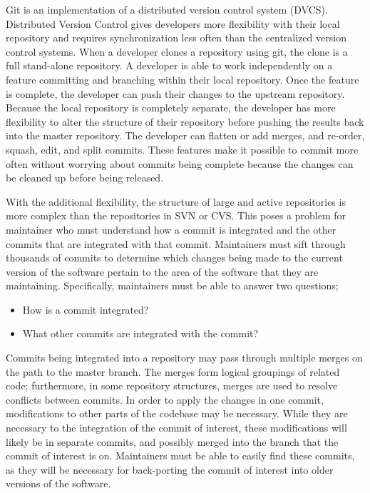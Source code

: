 Git is an implementation of a distributed version control system (DVCS).
Distributed Version Control gives developers more flexibility with their
local repository and requires synchronization less often than the
centralized version control systems. When a developer clones a
repository using git, the clone is a full stand-alone repository. A
developer is able to work independently on a feature committing and
branching within their local repository. Once the feature is complete,
the developer can push their changes to the upstream repository. Because
the local repository is completely separate, the developer has more
flexibility to alter the structure of their repository before pushing
the results back into the master repository. The developer can flatten
or add merges, and re-order, squash, edit, and split commits. These
features make it possible to commit more often without worrying about
commits being complete because the changes can be cleaned up before
being released.

With the additional flexibility, the structure of large and active
repositories is more complex than the repositories in SVN or CVS. This
poses a problem for maintainer who must understand how a commit is
integrated and the other commits that are integrated with that commit.
Maintainers must sift through thousands of commits to determine which
changes being made to the current version of the software pertain to the
area of the software that they are maintaining. Specifically,
maintainers must be able to answer two questions;

\begin{textbox}
\begin{itemize}
  \item How is a commit integrated?
  \item What other commits are integrated with the commit?
\end{itemize}
\end{textbox}

Commits being integrated into a repository may pass through multiple
merges on the path to the master branch. The merges form logical
groupings of related code; furthermore, in some repository structures,
merges are used to resolve conflicts between commits. In order to apply
the changes in one commit, modifications to other parts of the codebase
may be necessary. While they are necessary to the integration of the
commit of interest, these modifications will likely be in separate
commits, and possibly merged into the branch that the commit of interest
is on. Maintainers must be able to easily find these commits, as they
will be necessary for back-porting the commit of interest into older
versions of the software.

